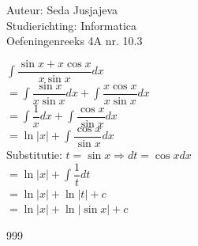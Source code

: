 \documentclass[a4paper]{article}
\newcommand{\integral}{\displaystyle\int}
\begin{document}
\noindent \large Auteur: Seda Jusjajeva\\
\noindent \large Studierichting: Informatica\\
\noindent \large Oefeningenreeks 4A nr. 10.3 \\

\medskip

\normalsize


$\integral\dfrac{\sin x + x\cos x}{x\sin x}dx$ \\

$= \integral\dfrac{\sin x}{x\sin x}dx + \integral\dfrac{x\cos x}{x\sin x}dx$ \\

$= \integral\dfrac{1}{x}dx + \integral\dfrac{\cos x}{\sin x}dx$ \\

$= \ln |x| + \displaystyle\int\dfrac{\cos x}{\sin x}dx$ \\

Substitutie: $t = \sin x \Rightarrow dt = \cos xdx$ \\

$= \ln |x| + \integral\dfrac{1}{t}dt$ \\

$= \ln |x| + \ln |t| + c$ \\

$= \ln |x| + \ln |\sin x| + c$ \\

\begin{thebibliography}{999}
\end{thebibliography}
\end{document}
